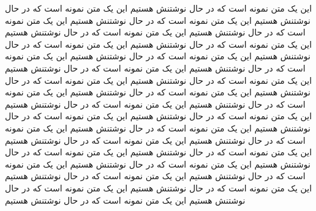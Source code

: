 این یک متن نمونه است که در حال نوشتنش هستیم  این یک متن نمونه است که در حال نوشتنش هستیم این یک متن نمونه است که در حال نوشتنش هستیم این یک متن نمونه است که در حال نوشتنش هستیم این یک متن نمونه است که در حال نوشتنش هستیم این یک متن نمونه است که در حال نوشتنش هستیم این یک متن نمونه است که در حال نوشتنش هستیم
این یک متن نمونه است که در حال نوشتنش هستیم  این یک متن نمونه است که در حال نوشتنش هستیم این یک متن نمونه است که در حال نوشتنش هستیم این یک متن نمونه است که در حال نوشتنش هستیم این یک متن نمونه است که در حال نوشتنش هستیم این یک متن نمونه است که در حال نوشتنش هستیم این یک متن نمونه است که در حال نوشتنش هستیم
این یک متن نمونه است که در حال نوشتنش هستیم  این یک متن نمونه است که در حال نوشتنش هستیم این یک متن نمونه است که در حال نوشتنش هستیم این یک متن نمونه است که در حال نوشتنش هستیم این یک متن نمونه است که در حال نوشتنش هستیم این یک متن نمونه است که در حال نوشتنش هستیم این یک متن نمونه است که در حال نوشتنش هستیم
این یک متن نمونه است که در حال نوشتنش هستیم  این یک متن نمونه است که در حال نوشتنش هستیم این یک متن نمونه است که در حال نوشتنش هستیم این یک متن نمونه است که در حال نوشتنش هستیم این یک متن نمونه است که در حال نوشتنش هستیم این یک متن نمونه است که در حال نوشتنش هستیم این یک متن نمونه است که در حال نوشتنش هستیم

